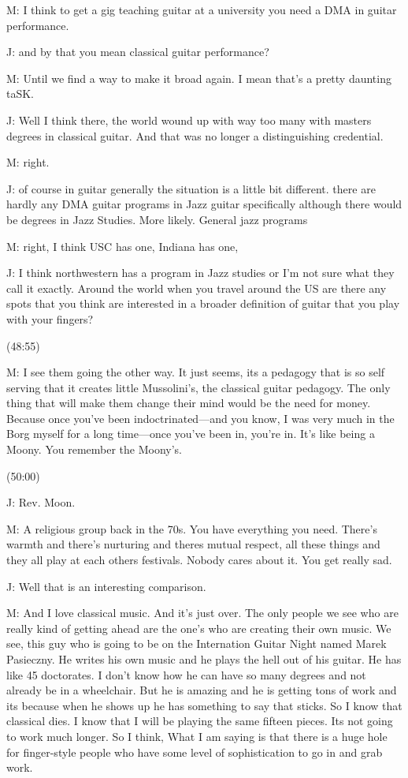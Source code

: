 \documentclass[11pt]{article}
\begin{document}
M: I think to get a gig teaching guitar at a university you need a DMA in guitar performance.

J: and by that you mean classical guitar performance?

M: Until we find a way to make it broad again. I mean that's a pretty daunting taSK. 

J: Well I think there, the world wound up with way too many with masters degrees in classical guitar. And that was no longer a distinguishing credential.

M: right. 

J: of course in guitar generally the situation is a little bit different. there are hardly any DMA guitar programs in Jazz guitar specifically although there would be degrees in Jazz Studies. More likely. General jazz programs

M: right, I think USC has one, Indiana has one,

J: I think northwestern has a program in Jazz studies or I'm not sure what they call it exactly. Around the world when you travel around the US are there any spots that you think are interested in a broader definition of guitar that you play with your fingers?

(48:55)

M: I see them going the other way. It just seems, its a pedagogy that is so self serving that it creates little Mussolini's, the classical guitar pedagogy. The only thing that will make them change their mind would be the need for money. Because once you've been indoctrinated—and you know, I was very much in the Borg myself for a long time—once you've been in, you're in. It's like being a Moony. You remember the Moony's.

(50:00)

J: Rev. Moon.

M: A religious group back in the 70s. You have everything you need. There's warmth and there's nurturing and theres mutual respect, all these things and they all play at each others festivals. Nobody cares about it. You get really sad.

J: Well that is an interesting comparison.

M: And I love classical music. And it's just over. The only people we see who are really kind of getting ahead are the one's who are creating their own music. We see, this guy who is going to be on the Internation Guitar Night named Marek Pasieczny. He writes his own music and he plays the hell out of his guitar. He has like 45 doctorates. I don't know how he can have so many degrees and not already be in a wheelchair. But he is amazing and he is getting tons of work and its because when he shows up he has something to say that sticks. So I know that classical dies. I know that I will be playing the same fifteen pieces. Its not going to work much longer. So I think, What I am saying is that there is a huge hole for finger-style people who have some level of sophistication to go in and grab work. 
\end{document}

